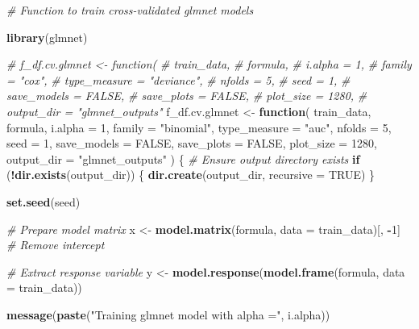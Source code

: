 \documentclass[
]{article}
\newenvironment{Shaded}{\begin{snugshade}}{\end{snugshade}}
\newcommand{\AttributeTok}[1]{\textcolor[rgb]{0.13,0.29,0.53}{#1}}
\newcommand{\CommentTok}[1]{\textcolor[rgb]{0.56,0.35,0.01}{\textit{#1}}}
\newcommand{\ConstantTok}[1]{\textcolor[rgb]{0.56,0.35,0.01}{#1}}
\newcommand{\ControlFlowTok}[1]{\textcolor[rgb]{0.13,0.29,0.53}{\textbf{#1}}}
\newcommand{\DecValTok}[1]{\textcolor[rgb]{0.00,0.00,0.81}{#1}}
\newcommand{\FunctionTok}[1]{\textcolor[rgb]{0.13,0.29,0.53}{\textbf{#1}}}
\newcommand{\NormalTok}[1]{#1}
\newcommand{\OtherTok}[1]{\textcolor[rgb]{0.56,0.35,0.01}{#1}}
\newcommand{\SpecialCharTok}[1]{\textcolor[rgb]{0.81,0.36,0.00}{\textbf{#1}}}
\newcommand{\StringTok}[1]{\textcolor[rgb]{0.31,0.60,0.02}{#1}}
\begin{document}
\begin{Shaded}
\begin{Highlighting}[]
\CommentTok{\# Function to train cross{-}validated glmnet models}

\FunctionTok{library}\NormalTok{(glmnet)}

\CommentTok{\# f\_df.cv.glmnet \textless{}{-} function(}
\CommentTok{\#         train\_data,}
\CommentTok{\#         formula,}
\CommentTok{\#         i.alpha = 1,}
\CommentTok{\#         family = "cox",}
\CommentTok{\#         type\_measure = "deviance",}
\CommentTok{\#         nfolds = 5,}
\CommentTok{\#         seed = 1,}
\CommentTok{\#         save\_models = FALSE,}
\CommentTok{\#         save\_plots = FALSE,}
\CommentTok{\#         plot\_size = 1280,}
\CommentTok{\#         output\_dir = "glmnet\_outputs"}
\NormalTok{f\_df.cv.glmnet }\OtherTok{\textless{}{-}} \ControlFlowTok{function}\NormalTok{(}
\NormalTok{        train\_data,}
\NormalTok{        formula,}
        \AttributeTok{i.alpha =} \DecValTok{1}\NormalTok{,}
        \AttributeTok{family =} \StringTok{"binomial"}\NormalTok{,}
        \AttributeTok{type\_measure =} \StringTok{"auc"}\NormalTok{,}
        \AttributeTok{nfolds =} \DecValTok{5}\NormalTok{,}
        \AttributeTok{seed =} \DecValTok{1}\NormalTok{,}
        \AttributeTok{save\_models =} \ConstantTok{FALSE}\NormalTok{,}
        \AttributeTok{save\_plots =} \ConstantTok{FALSE}\NormalTok{,}
        \AttributeTok{plot\_size =} \DecValTok{1280}\NormalTok{,}
        \AttributeTok{output\_dir =} \StringTok{"glmnet\_outputs"}
\NormalTok{) \{}
    \CommentTok{\# Ensure output directory exists}
    \ControlFlowTok{if}\NormalTok{ (}\SpecialCharTok{!}\FunctionTok{dir.exists}\NormalTok{(output\_dir)) \{}
        \FunctionTok{dir.create}\NormalTok{(output\_dir, }\AttributeTok{recursive =} \ConstantTok{TRUE}\NormalTok{)}
\NormalTok{    \}}
    
    \FunctionTok{set.seed}\NormalTok{(seed)}
    
    \CommentTok{\# Prepare model matrix}
\NormalTok{    x }\OtherTok{\textless{}{-}} \FunctionTok{model.matrix}\NormalTok{(formula, }\AttributeTok{data =}\NormalTok{ train\_data)[, }\SpecialCharTok{{-}}\DecValTok{1}\NormalTok{]  }\CommentTok{\# Remove intercept}
    
    \CommentTok{\# Extract response variable}
\NormalTok{    y }\OtherTok{\textless{}{-}} \FunctionTok{model.response}\NormalTok{(}\FunctionTok{model.frame}\NormalTok{(formula, }\AttributeTok{data =}\NormalTok{ train\_data))}
    
    
    \FunctionTok{message}\NormalTok{(}\FunctionTok{paste}\NormalTok{(}\StringTok{"Training glmnet model with alpha ="}\NormalTok{, i.alpha))}
    

\end{Highlighting}
\end{Shaded}
\end{document}
